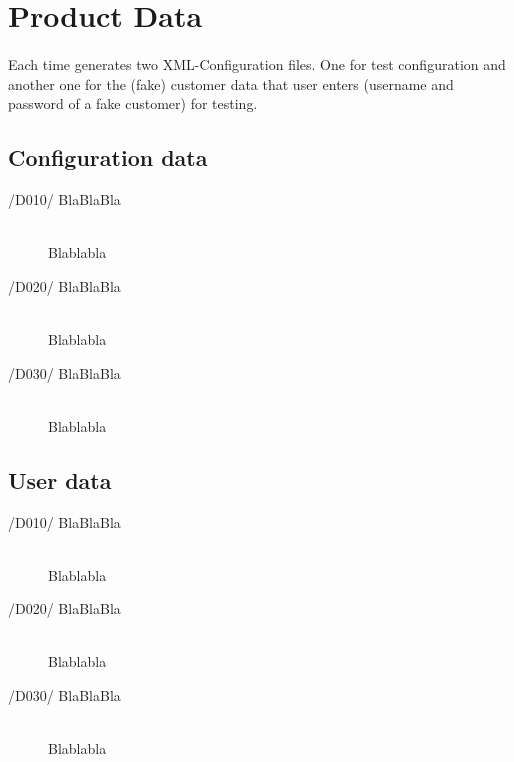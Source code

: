 \section{Product Data}
\paragraph{}Each time \app{} generates two XML-Configuration files. One for test configuration and another one for the (fake) customer data that user enters (username and password of a fake customer) for testing.

\subsection{Configuration data}
\begin{description}
\item[/D010/ BlaBlaBla]\hfill \\ Blablabla
\item[/D020/ BlaBlaBla]\hfill \\ Blablabla
\item[/D030/ BlaBlaBla]\hfill \\ Blablabla
\end{description}

\subsection{User data}
\begin{description}
\item[/D010/ BlaBlaBla]\hfill \\ Blablabla
\item[/D020/ BlaBlaBla]\hfill \\ Blablabla
\item[/D030/ BlaBlaBla]\hfill \\ Blablabla
\end{description}
